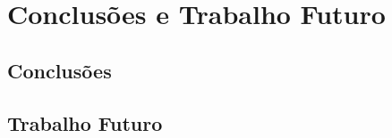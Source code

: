 \chapter{Conclusões e Trabalho Futuro} \label{chap:conclF}

\section{Conclusões}

\section{Trabalho Futuro}
